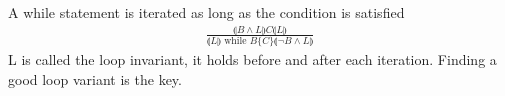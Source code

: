 \documentclass[a4paper]{article}
\theoremstyle{plain}
\theoremstyle{definition}
\newtheorem{defn}{Definition}[section]
\theoremstyle{remark}
\begin{document}
\begin{tcolorbox}[colback=black!3!white,colframe=black!60!white,title=\begin{defn}Loop Rule \label{Loop Rule}\end{defn}]
A while statement is iterated as long as the condition is satisfied
\begin{align}
\frac{\llparenthesis B \land L \rrparenthesis C \llparenthesis L \rrparenthesis}{\llparenthesis L \rrparenthesis \text{ while } B \{ C \} \llparenthesis \neg B \land L \rrparenthesis}
\end{align}
L is called the loop invariant, it holds before and after each iteration. Finding a good loop variant is the key.
\end{tcolorbox}
\end{document}
